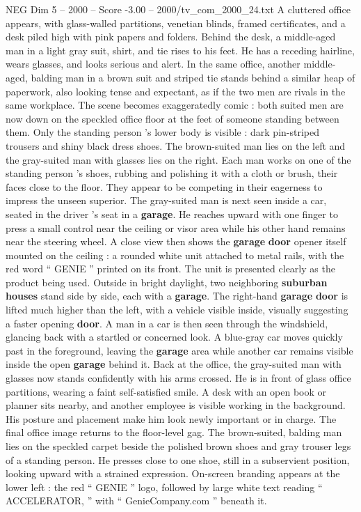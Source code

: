 \begin{textsample}{NEG Dim 5 – 2000 – Score -3.00 – 2000/tv\_com\_2000\_24.txt}  \label{ex:f5_neg_073}
A cluttered office appears, with glass-walled partitions, venetian blinds, framed certificates, and a desk piled high with pink papers and folders.
Behind the desk, a middle-aged man in a light gray suit, shirt, and tie rises to his feet.
He has a receding hairline, wears glasses, and looks serious and alert.
In the same office, another middle-aged, balding man in a brown suit and striped tie stands behind a similar heap of paperwork, also looking tense and expectant, as if the two men are rivals in the same workplace.
The scene becomes exaggeratedly comic : both suited men are now down on the speckled office floor at the feet of someone standing between them.
Only the standing person ’s lower body is visible : dark pin-striped trousers and shiny black dress shoes.
The brown-suited man lies on the left and the gray-suited man with glasses lies on the right.
Each man works on one of the standing person ’s shoes, rubbing and polishing it with a cloth or brush, their faces close to the floor.
They appear to be competing in their eagerness to impress the unseen superior.
The gray-suited man is next seen inside a car, seated in the driver ’s seat in a \textbf{garage}.
He reaches upward with one finger to press a small control near the ceiling or visor area while his other hand remains near the steering wheel.
A close view then shows the \textbf{garage} \textbf{door} opener itself mounted on the ceiling : a rounded white unit attached to metal rails, with the red word “ GENIE ” printed on its front.
The unit is presented clearly as the product being used.
Outside in bright daylight, two neighboring \textbf{suburban} \textbf{houses} stand side by side, each with a \textbf{garage}.
The right-hand \textbf{garage} \textbf{door} is lifted much higher than the left, with a vehicle visible inside, visually suggesting a faster opening \textbf{door}.
A man in a car is then seen through the windshield, glancing back with a startled or concerned look.
A blue-gray car moves quickly past in the foreground, leaving the \textbf{garage} area while another car remains visible inside the open \textbf{garage} behind it.
Back at the office, the gray-suited man with glasses now stands confidently with his arms crossed.
He is in front of glass office partitions, wearing a faint self-satisfied smile.
A desk with an open book or planner sits nearby, and another employee is visible working in the background.
His posture and placement make him look newly important or in charge.
The final office image returns to the floor-level gag.
The brown-suited, balding man lies on the speckled carpet beside the polished brown shoes and gray trouser legs of a standing person.
He presses close to one shoe, still in a subservient position, looking upward with a strained expression.
On-screen branding appears at the lower left : the red “ GENIE ” logo, followed by large white text reading “ ACCELERATOR, ” with “ GenieCompany.com ” beneath it.

\end{textsample}
